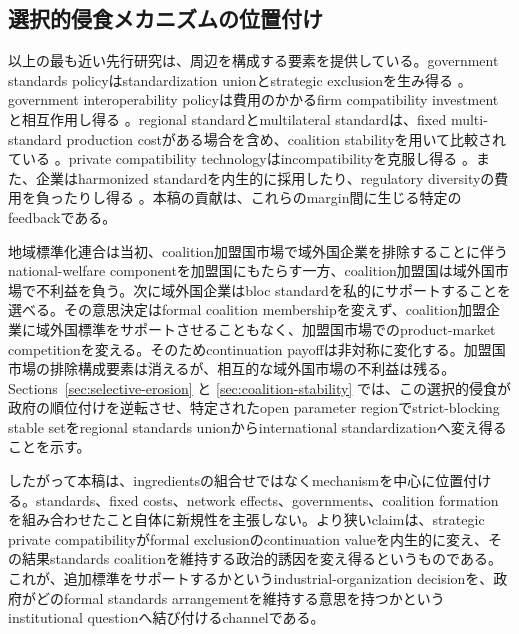 \subsection{選択的侵食メカニズムの位置付け}
\label{subsec:lit-positioning}

以上の最も近い先行研究は、周辺を構成する要素を提供している。government standards policyはstandardization unionとstrategic exclusionを生み得る \citep{gandalShy2001}。government interoperability policyは費用のかかるfirm compatibility investmentと相互作用し得る \citep{klimenkoInteroperability2009}。regional standardとmultilateral standardは、fixed multi-standard production costがある場合を含め、coalition stabilityを用いて比較されている \citep{takaradaEtAl2020}。private compatibility technologyはincompatibilityを克服し得る \citep{farrellSaloner1992,doganogluWright2006}。また、企業はharmonized standardを内生的に採用したり、regulatory diversityの費用を負ったりし得る \citep{schmidtSteingress2022,maggiMrazova2024}。本稿の貢献は、これらのmargin間に生じる特定のfeedbackである。

地域標準化連合は当初、coalition加盟国市場で域外国企業を排除することに伴うnational-welfare componentを加盟国にもたらす一方、coalition加盟国は域外国市場で不利益を負う。次に域外国企業はbloc standardを私的にサポートすることを選べる。その意思決定はformal coalition membershipを変えず、coalition加盟企業に域外国標準をサポートさせることもなく、加盟国市場でのproduct-market competitionを変える。そのためcontinuation payoffは非対称に変化する。加盟国市場の排除構成要素は消えるが、相互的な域外国市場の不利益は残る。Sections~\ref{sec:selective-erosion} と \ref{sec:coalition-stability} では、この選択的侵食が政府の順位付けを逆転させ、特定されたopen parameter regionでstrict-blocking stable setをregional standards unionからinternational standardizationへ変え得ることを示す。

したがって本稿は、ingredientsの組合せではなくmechanismを中心に位置付ける。standards、fixed costs、network effects、governments、coalition formationを組み合わせたこと自体に新規性を主張しない。より狭いclaimは、strategic private compatibilityがformal exclusionのcontinuation valueを内生的に変え、その結果standards coalitionを維持する政治的誘因を変え得るというものである。これが、追加標準をサポートするかというindustrial-organization decisionを、政府がどのformal standards arrangementを維持する意思を持つかというinstitutional questionへ結び付けるchannelである。
